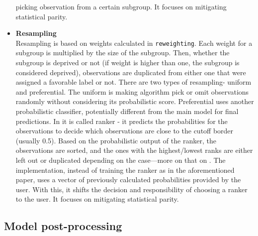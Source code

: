 \begin{itemize}
  picking observation from a certain subgroup. It focuses on mitigating
  statistical parity.
\item
  \textbf{Resampling}\\
  Resampling is based on weights calculated in \texttt{reweighting}.
  Each weight for a subgroup is multiplied by the size of the subgroup.
  Then, whether the subgroup is deprived or not (if weight is higher
  than one, the subgroup is considered deprived), observations are
  duplicated from either one that were assigned a favorable label or
  not. There are two types of resampling- uniform and preferential. The
  uniform is making algorithm pick or omit observations randomly without
  considering its probabilistic score. Preferential uses another
  probabilistic classifier, potentially different from the main model
  for final predictions. In \citet{kamiran} it is called ranker - it
  predicts the probabilities for the observations to decide which
  observations are close to the cutoff border (usually 0.5). Based on
  the probabilistic output of the ranker, the observations are sorted,
  and the ones with the highest/lowest ranks are either left out or
  duplicated depending on the case---more on that on \citet{kamiran}.
  The  implementation, instead of training the ranker as
  in the aforementioned paper, uses a vector of previously calculated
  probabilities provided by the user. With this, it shifts the decision
  and responsibility of choosing a ranker to the user. It focuses on
  mitigating statistical parity.
\end{itemize}

\hypertarget{model-post-processing}{%
\subsection{Model post-processing}\label{model-post-processing}}

